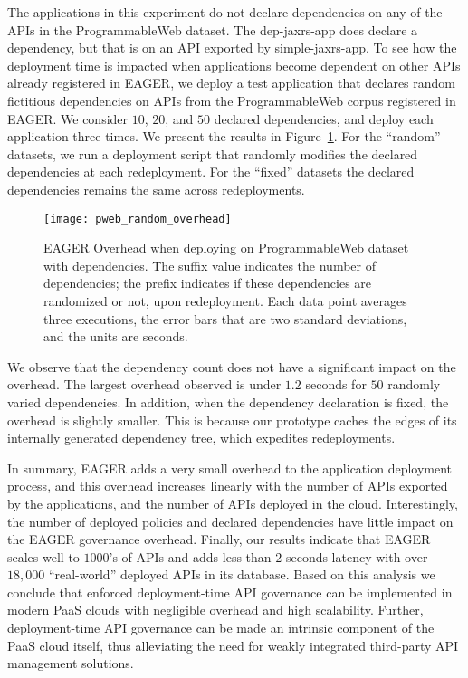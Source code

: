 The applications in this experiment do not declare dependencies on any of the APIs 
in the ProgrammableWeb dataset. The dep-jaxrs-app does declare a dependency, 
but that is on an API exported by 
simple-jaxrs-app. To see how the deployment time is impacted
when applications become dependent on other APIs already registered in EAGER, we
deploy a test application that declares random fictitious dependencies on APIs
from the ProgrammableWeb corpus registered in EAGER.  We consider 
$10$, $20$, and $50$ declared dependencies, and deploy each
application three times.
We present the results in Figure~\ref{fig:pweb_random_overhead}.
For the ``random'' datasets, we
run a deployment script that randomly modifies the 
declared dependencies at each redeployment. For the 
``fixed'' datasets the declared dependencies remains the same across
redeployments.

\begin{figure}
\centering
\texttt{[image: pweb\_random\_overhead]}
\caption{EAGER Overhead when deploying on ProgrammableWeb dataset with
dependencies. The suffix value indicates the number of dependencies;
the prefix indicates if these dependencies are randomized or not, upon
redeployment.  Each data point averages three executions,
the error bars that are two standard deviations, and the units are seconds.
\label{fig:pweb_random_overhead}
}
\end{figure}

We observe that the dependency count does not have a significant impact on 
the overhead.  The largest overhead observed is under $1.2$ seconds
for $50$ randomly varied dependencies.
In addition, when the dependency declaration is fixed, the overhead is slightly smaller. 
This is because our prototype caches the edges of its internally generated dependency tree, 
which expedites redeployments.

In summary, EAGER adds a very small overhead to the application deployment
process, and 
this overhead increases linearly with the number of APIs exported by the applications,
and the number of APIs deployed in the cloud. 
Interestingly, the number of deployed policies and declared dependencies
have little impact on the EAGER governance overhead. 
Finally, our results indicate that EAGER scales 
well to $1000$'s of APIs and adds less than $2$ seconds latency with over
$18,000$ ``real-world'' deployed APIs in its database.
Based on this analysis we conclude that enforced
deployment-time API governance can be implemented
in modern PaaS clouds with negligible overhead and high
scalability. Further, deployment-time API governance can be
made an intrinsic component of the PaaS cloud itself, thus
alleviating the need for weakly integrated third-party API
management solutions.
